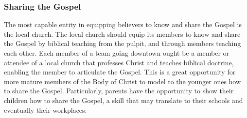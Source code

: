 \subsubsection{Sharing the Gospel}

    \qGreatCommission
    The most capable entity in equipping believers to know and share the Gospel is the local church.
    The local church should equip its members to know and share the Gospel by biblical teaching from the pulpit, and through members teaching each other.
    Each member of a team going downtown ought be a member or attendee of a local church that professes Christ and teaches biblical doctrine, enabling the member to articulate the Gospel.
    This is a great opportunity for more mature members of the Body of Christ to model to the younger ones how to share the Gospel.
    Particularly, parents have the opportunity to show their children how to share the Gospel, a skill that may translate to their schools and eventually their workplaces.

